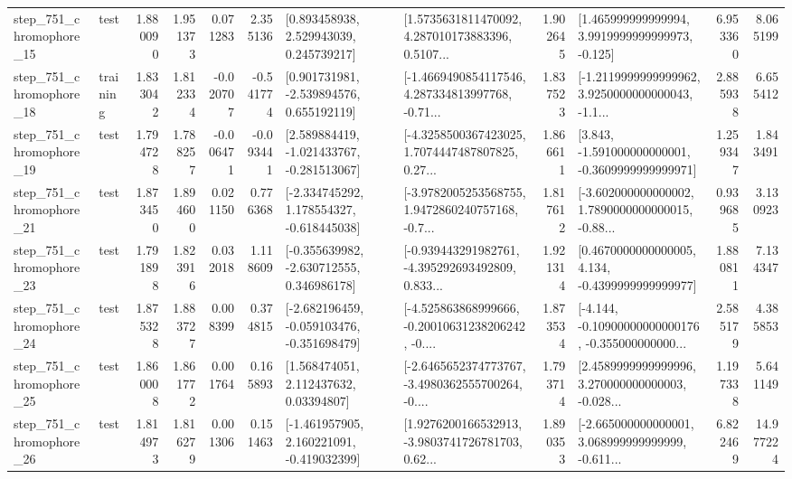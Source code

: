 \begin{tabular}{llrrrrllrlrr}
  step\_751\_chromophore\_15 &      test &      1.880090 &    1.951373 &      0.071283 &  2.355136 &     [0.893458938, 2.529943039, 0.245739217] &  [1.5735631811470092, 4.287010173883396, 0.5107... &       1.902645 &    [1.465999999999994, 3.9919999999999973, -0.125] &            6.953360 &          8.065199 \\
  step\_751\_chromophore\_18 &  training &      1.833042 &    1.812334 &     -0.020707 & -0.541774 &    [0.901731981, -2.539894576, 0.655192119] &  [-1.4669490854117546, 4.287334813997768, -0.71... &       1.837523 &  [-1.2119999999999962, 3.9250000000000043, -1.1... &            2.885938 &          6.655412 \\
  step\_751\_chromophore\_19 &      test &      1.794728 &    1.788257 &     -0.006471 & -0.093441 &   [2.589884419, -1.021433767, -0.281513067] &  [-4.3258500367423025, 1.7074447487807825, 0.27... &       1.866611 &   [3.843, -1.591000000000001, -0.3609999999999971] &            1.259347 &          1.843491 \\
  step\_751\_chromophore\_21 &      test &      1.873450 &    1.894600 &      0.021150 &  0.776368 &   [-2.334745292, 1.178554327, -0.618445038] &  [-3.9782005253568755, 1.9472860240757168, -0.7... &       1.817612 &  [-3.602000000000002, 1.7890000000000015, -0.88... &            0.939685 &          3.130923 \\
  step\_751\_chromophore\_23 &      test &      1.791898 &    1.823916 &      0.032018 &  1.118609 &   [-0.355639982, -2.630712555, 0.346986178] &  [-0.939443291982761, -4.395292693492809, 0.833... &       1.921314 &   [0.4670000000000005, 4.134, -0.4399999999999977] &            1.880811 &          7.134347 \\
  step\_751\_chromophore\_24 &      test &      1.875328 &    1.883727 &      0.008399 &  0.374815 &  [-2.682196459, -0.059103476, -0.351698479] &  [-4.525863868999666, -0.20010631238206242, -0.... &       1.873534 &  [-4.144, -0.10900000000000176, -0.355000000000... &            2.585179 &          4.385853 \\
  step\_751\_chromophore\_25 &      test &      1.860008 &    1.861772 &      0.001764 &  0.165893 &      [1.568474051, 2.112437632, 0.03394807] &  [-2.6465652374773767, -3.4980362555700264, -0.... &       1.793714 &  [2.4589999999999996, 3.270000000000003, -0.028... &            1.197338 &          5.641149 \\
  step\_751\_chromophore\_26 &      test &      1.814973 &    1.816279 &      0.001306 &  0.151463 &   [-1.461957905, 2.160221091, -0.419032399] &  [1.9276200166532913, -3.9803741726781703, 0.62... &       1.890353 &  [-2.665000000000001, 3.068999999999999, -0.611... &            6.822469 &         14.977224 \\

\end{tabular}
